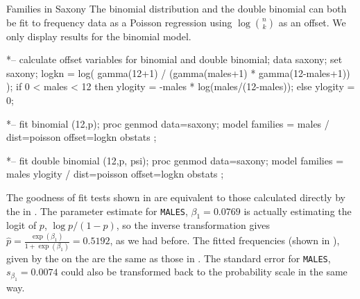 \begin{Example}[saxony2]{Families in Saxony}
The binomial distribution and the double binomial can both be fit to frequency data as a Poisson
regression using $\log \binom{n}{k}$ as an offset.
We only display results for the binomial model.
\begin{listing}
*-- calculate offset variables for binomial and double binomial;
data saxony;
   set saxony;
   logkn = log( gamma(12+1) / (gamma(males+1) * gamma(12-males+1)) );
   if 0 < males < 12
      then ylogity = -males * log(males/(12-males));
      else ylogity = 0;

   *-- fit binomial (12,p);
proc genmod data=saxony;
   model families = males /
      dist=poisson offset=logkn obstats ;

   *-- fit double binomial (12,p, psi);
proc genmod data=saxony;
   model families = males ylogity /
      dist=poisson offset=logkn obstats ;
\end{listing}
The goodness of fit tests shown in 
are equivalent to those calculated directly by the
 in .
The parameter estimate for \texttt{MALES}, $\beta_1 = 0.0769$
is actually estimating the logit of $p$, $\log p / (1-p)$,
so the inverse transformation gives
$\hat{p} = \frac{\exp (\beta_1)}{1 + \exp (\beta_1)} = 0.5192$,
as we had before.
The fitted frequencies (shown in ), given by the 
on the  are the same as those
in .
The standard error for \texttt{MALES}, $s_{\beta_1} = 0.0074$
could also be transformed back to the probability scale in the same
way.
\begin{Output}
\caption{Fit of the Binomial($12, p$) to the Families in Saxony data: Goodness of fit tests}\label{out:saxony2.1}
\small

\end{Output}
\begin{Output}
\caption{Fit of the Binomial($12, p$) to the Families in Saxony data: Observed and fitted frequencies}\label{out:saxony2.2}
\small

\end{Output}
\end{Example}
